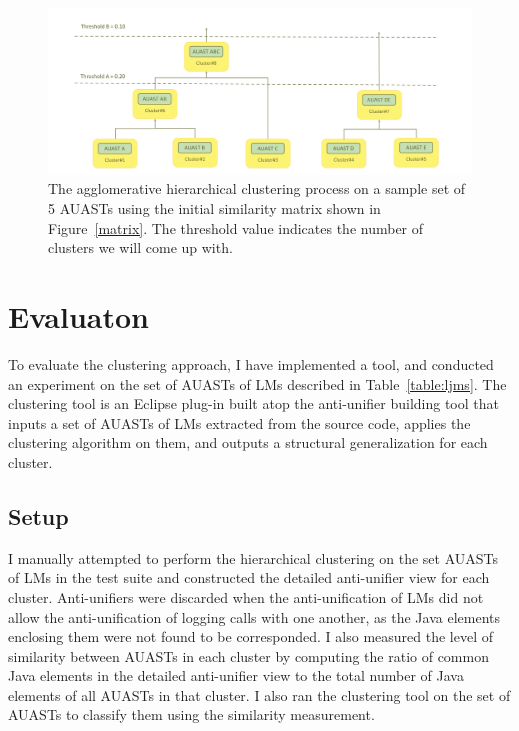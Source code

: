 \begin{figure} [H]
  \centering\includegraphics [width = \textwidth]{Drawing4/overview2.pdf}
  \caption{The agglomerative hierarchical clustering process on a sample set of  5 AUASTs using the initial similarity matrix shown in Figure~\ref{matrix}. The threshold value indicates the number of clusters we will come up with.}
  \label{fig:overview2}
\end{figure}


\section{Evaluaton} \label{evaluation}
To evaluate the clustering approach, I have implemented a tool, and conducted an experiment on the set of AUASTs of LMs described in Table~\ref{table:ljms}. The clustering tool is an Eclipse plug-in built atop the anti-unifier building tool that inputs a set of AUASTs of LMs extracted from the source code, applies the clustering algorithm on them, and outputs a structural generalization for each cluster.


\subsection{Setup}  \label{study3-setup}
I manually attempted to perform the hierarchical clustering on the set AUASTs of LMs in the test suite and constructed the detailed anti-unifier view for each cluster. Anti-unifiers were discarded when the anti-unification of LMs did not allow the anti-unification of logging calls with one another, as the Java elements enclosing them were not found to be corresponded. I also measured the level of similarity between AUASTs in each cluster by computing the ratio of common Java elements in the detailed anti-unifier view to the total number of Java elements of all AUASTs in that cluster. I also ran the clustering tool on the set of AUASTs to classify them using the similarity measurement.


